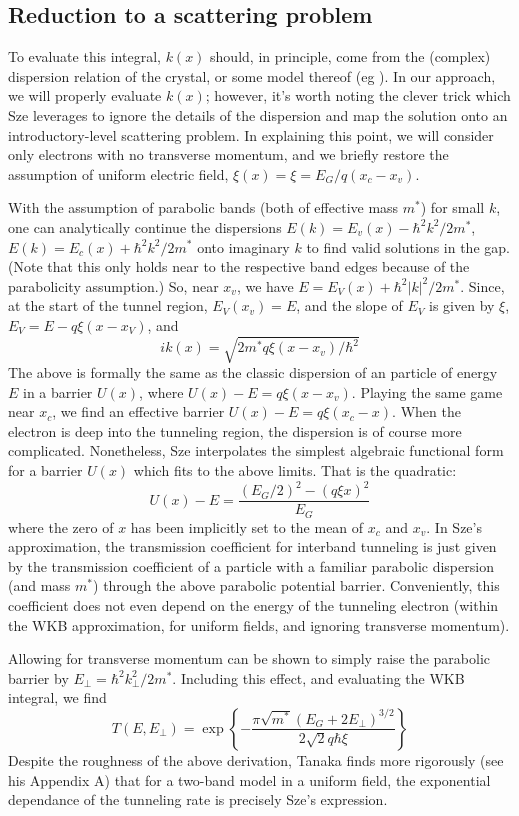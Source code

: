 \subsection{Reduction to a scattering problem}
To evaluate this integral, $k(x)$ should, in principle, come from the (complex) dispersion relation of the crystal, or some model thereof (eg \cite{Guan_2011}).  In our approach, we will properly evaluate $k(x)$; however, it's worth noting the clever trick which Sze leverages to ignore the details of the dispersion and map the solution onto an introductory-level scattering problem.  In explaining this point, we will consider only electrons with no transverse momentum, and we briefly restore the assumption of uniform electric field, $\xi(x)=\xi=E_G/q(x_c-x_v)$.

With the assumption of parabolic bands (both of effective mass $m^*$) for small $k$, one can  analytically continue the dispersions $E(k)=E_v(x)-\hbar^2k^2/2m^*$, $E(k)=E_c(x)+\hbar^2k^2/2m^*$ onto imaginary $k$ to find valid solutions in the gap.  (Note that this only holds near to the respective band edges because of the parabolicity assumption.)  So, near $x_v$, we have $E=E_V(x)+\hbar^2|k|^2/2m^*$.  Since, at the start of the tunnel region, $E_V(x_v)=E$, and the slope of $E_V$ is given by $\xi$, $E_V=E-q\xi(x-x_V)$, and
$$ik(x)=\sqrt{2m^*q\xi(x-x_v)/\hbar^2}$$
The above is formally the same as the classic dispersion of an particle of energy $E$ in a barrier $U(x)$, where $U(x)-E=q\xi(x-x_v)$.  Playing the same game near $x_c$, we find an effective barrier $U(x)-E=q\xi(x_c-x)$.  When the electron is deep into the tunneling region, the dispersion is of course more complicated.  Nonetheless, Sze interpolates the simplest algebraic functional form for a barrier $U(x)$ which fits to the above limits.  That is the quadratic:
$$U(x)-E=\frac{(E_G/2)^2-(q\xi x)^2}{E_G}$$
where the zero of $x$ has been implicitly set to the mean of $x_c$ and $x_v$.  In Sze's approximation, the transmission coefficient for interband tunneling is just given by the transmission coefficient of a particle with a familiar parabolic dispersion (and mass $m^*$) through the above parabolic potential barrier.  Conveniently, this coefficient does not even depend on the energy of the tunneling electron (within the WKB approximation, for uniform fields, and ignoring transverse momentum).

Allowing for transverse momentum can be shown to simply raise the parabolic barrier by $E_\perp=\hbar^2k_\perp^2/2m^*$.  Including this effect, and evaluating the WKB integral, we find
$$T(E,E_\perp)=\exp\left\{-\frac{\pi\sqrt{m^*}(E_G+2E_\perp)^{3/2}}{2\sqrt{2}q\hbar\xi}\right\}$$
Despite the roughness of the above derivation, Tanaka \cite{Tanaka_1994} finds more rigorously (see his Appendix A) that for a two-band model in a uniform field, the exponential dependance of the tunneling rate is precisely Sze's expression.